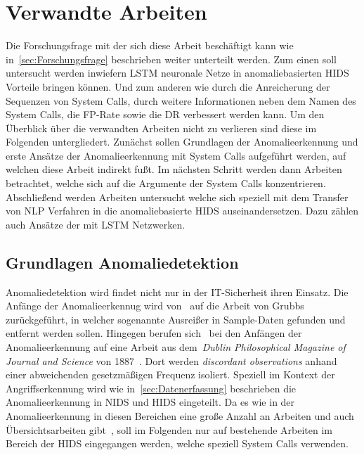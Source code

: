 \chapter{Verwandte Arbeiten}\label{ch:verwandte_arbeiten}

Die Forschungsfrage mit der sich diese Arbeit beschäftigt kann wie in~\autoref{sec:Forschungsfrage} beschrieben weiter unterteilt werden.
Zum einen soll untersucht werden inwiefern \ac{LSTM} neuronale Netze in anomaliebasierten \ac{HIDS} Vorteile bringen können.
Und zum anderen wie durch die Anreicherung der Sequenzen von System Calls, durch weitere Informationen neben dem Namen des System Calls, die \ac{FP}-Rate sowie die \ac{DR} verbessert werden kann.
Um den Überblick über die verwandten Arbeiten nicht zu verlieren sind diese im Folgenden untergliedert.
Zunächst sollen Grundlagen der Anomalieerkennung und erste Ansätze der Anomalieerkennung mit System Calls aufgeführt werden, auf welchen diese Arbeit indirekt fußt.
Im nächsten Schritt werden dann Arbeiten betrachtet, welche sich auf die Argumente der System Calls konzentrieren.
Abschließend werden Arbeiten untersucht welche sich speziell mit dem Transfer von \ac{NLP} Verfahren in die anomaliebasierte \ac{HIDS} auseinandersetzen.
Dazu zählen auch Ansätze der mit \ac{LSTM} Netzwerken.

\section{Grundlagen Anomaliedetektion}

    Anomaliedetektion wird findet nicht nur in der IT-Sicherheit ihren Einsatz.
    Die Anfänge der Anomalieerkennug wird von~\cite{ANOMALYBOOKKISHAN2017} auf die Arbeit von Grubbs~\cite{ANOMALYDEFINITION1969} zurückgeführt, in welcher sogenannte Ausreißer in Sample-Daten gefunden und entfernt werden sollen.
    Hingegen berufen sich~\cite{ANOMALYSURVEY} bei den Anfängen der Anomalieerkennung auf eine Arbeit aus dem~\textit{Dublin Philosophical Magazine of Journal and Science} von 1887~\cite{ANOMALYDEFINITION1887}.
    Dort werden \textit{discordant observations} anhand einer abweichenden gesetzmäßigen Frequenz isoliert. 
    Speziell im Kontext der Angriffserkennung wird wie in~\autoref{sec:Datenerfassung} beschrieben die Anomalieerkennung in \ac{NIDS} und \ac{HIDS} eingeteilt.
    Da es wie in der Anomalieerkennung in diesen Bereichen eine große Anzahl an Arbeiten und auch Übersichtsarbeiten gibt~\cite{ANOMALYSURVEY, ANOMALYSURVEY2, ANOMALYSURVEY3}, soll im Folgenden nur auf bestehende Arbeiten im Bereich der \ac{HIDS} eingegangen werden, welche speziell System Calls verwenden.

